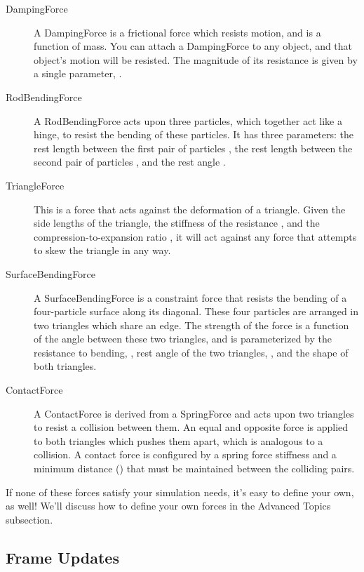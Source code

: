 \begin{description}
\item[DampingForce] A DampingForce is a frictional force which resists
  motion, and is a function of mass. You can attach a DampingForce to
  any object, and that object's motion will be resisted. The magnitude
  of its resistance is given by a single parameter, .

\item[RodBendingForce] A RodBendingForce acts upon three particles, which
  together act like a hinge, to resist the bending of these
  particles. It has three parameters: the rest length between the
  first pair of particles , the rest length between the
  second pair of particles , and the rest angle .

\item[TriangleForce] This is a force that acts against the
  deformation of a triangle. Given the side lengths of the triangle,
  the stiffness of the resistance , and the
  compression-to-expansion ratio , it will act against any
  force that attempts to skew the triangle in any way.

\item[SurfaceBendingForce] A SurfaceBendingForce is a constraint force that
  resists the bending of a four-particle surface along its diagonal.
  These four particles are arranged in two triangles which share an
  edge. The strength of the force is a function of the angle between
  these two triangles, and is parameterized by the resistance to
  bending, , rest angle of the two triangles, , and
  the shape of both triangles.

\item[ContactForce] A ContactForce is derived from a SpringForce and acts
  upon two triangles to resist a collision between them. An equal and
  opposite force is applied to both triangles which pushes them apart,
  which is analogous to a collision. A contact force is configured by
  a spring force stiffness  and a minimum distance
  () that must be maintained between the colliding pairs.
\end{description}

If none of these forces satisfy your simulation needs, it's easy to
define your own, as well! We'll discuss how to define your own forces
in the Advanced Topics subsection.

\subsection{Frame Updates}

